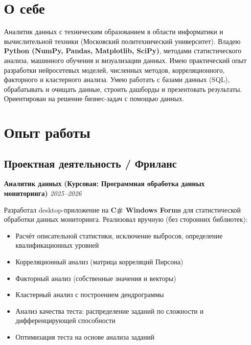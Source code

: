 \documentclass[10pt,a4paper]{article}
\newcommand{\projectEntry}[3]{\textbf{#1} \hfill \textit{#2}\par #3\par\vspace{0.3em}}
\begin{document}

\section{О себе}

Аналитик данных с техническим образованием в области информатики и вычислительной техники (Московский политехнический университет). Владею \textbf{Python (NumPy, Pandas, Matplotlib, SciPy)}, методами статистического анализа, машинного обучения и визуализации данных. Имею практический опыт разработки нейросетевых моделей, численных методов, корреляционного, факторного и кластерного анализа. Умею работать с базами данных (SQL), обрабатывать и очищать данные, строить дашборды и презентовать результаты. Ориентирован на решение бизнес-задач с помощью данных.

\section{Опыт работы}

\subsection{Проектная деятельность / Фриланс}

\projectEntry{Аналитик данных (Курсовая: Программная обработка данных мониторинга)}{2025–2026}
{Разработал desktop-приложение на \textbf{C\# Windows Forms} для статистической обработки данных мониторинга. Реализовал вручную (без сторонних библиотек):
\begin{itemize}
    \item Расчёт описательной статистики, исключение выбросов, определение квалификационных уровней
    \item Корреляционный анализ (матрица корреляций Пирсона)
    \item Факторный анализ (собственные значения и векторы)
    \item Кластерный анализ с построением дендрограммы
    \item Анализ качества теста: распределение заданий по сложности и дифференцирующей способности
    \item Оптимизация теста на основе анализа заданий
\end{itemize}}
\end{document}
